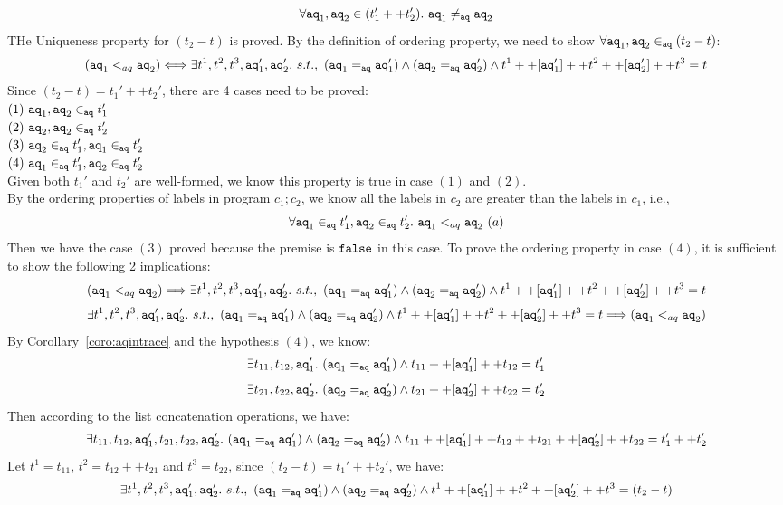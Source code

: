 \[
	\forall \mathtt{aq}_1, \mathtt{aq}_2 \in (t_1' ++ t_2'). ~ \mathtt{aq}_1 \neq_{\mathtt{aq}} \mathtt{aq}_2
\]
%
THe Uniqueness property for $(t_2 - t)$ is proved.
%
%
By the definition of ordering property, we need to show $\forall \mathtt{aq}_1, \mathtt{aq}_2 \in_{\mathtt{aq}} (t_2 - t)$:
\[
	(\mathtt{aq}_1 <_{aq} \mathtt{aq}_2) \Longleftrightarrow
	\exists t^1, t^2, t^3, \mathtt{aq}_1', \mathtt{aq}_2'. ~ s.t.,~ 
	(\mathtt{aq}_1 =_{\mathtt{aq}} \mathtt{aq}_1') \land (\mathtt{aq}_2 =_{\mathtt{aq}} \mathtt{aq}_2') \land t^1 ++ [\mathtt{aq}_1'] ++ t^2 ++ [\mathtt{aq}_2'] ++ t^3 = t
\]
%
Since $(t_2 - t) = t_1' ++ t_2'$, there are 4 cases need to be proved:
\\
$(1) ~ \mathtt{aq}_1, \mathtt{aq}_2 \in_{\mathtt{aq}} t_1'$
\\
$(2) ~ \mathtt{aq}_2, \mathtt{aq}_2 \in_{\mathtt{aq}} t_2'$
\\
$(3) ~ \mathtt{aq}_2 \in_{\mathtt{aq}} t_1', \mathtt{aq}_1 \in_{\mathtt{aq}} t_2'$ 
\\
$(4) ~ \mathtt{aq}_1 \in_{\mathtt{aq}} t_1', \mathtt{aq}_2 \in_{\mathtt{aq}} t_2'$
\\
Given both $t_1'$ and $t_2'$ are well-formed, we know this property is true in case $(1)$ and $(2)$.
\\
By the ordering properties of labels in program $c_1; c_2$,
we know all the labels in $c_2$ are greater than the labels in $c_1$, i.e.,
\[
	\forall \mathtt{aq}_1 \in_{\mathtt{aq}} t_1', \mathtt{aq}_2 \in_{\mathtt{aq}} t_2'. ~ \mathtt{aq}_1 <_{aq} \mathtt{aq}_2 ~ (a)
\]
%
Then we have the case $(3)$ proved because the premise is $\mathtt{false}$ in this case.
%
To prove the ordering property in case $(4)$, it is sufficient to show the following 2 implications:
\[
	(\mathtt{aq}_1 <_{aq} \mathtt{aq}_2) 
	\Longrightarrow
	\exists t^1, t^2, t^3, \mathtt{aq}_1', \mathtt{aq}_2'. ~ s.t.,~ 
	(\mathtt{aq}_1 =_{\mathtt{aq}} \mathtt{aq}_1') \land (\mathtt{aq}_2 =_{\mathtt{aq}} \mathtt{aq}_2') \land t^1 ++ [\mathtt{aq}_1'] ++ t^2 ++ [\mathtt{aq}_2'] ++ t^3 = t
\]
%
\[
	\exists t^1, t^2, t^3, \mathtt{aq}_1', \mathtt{aq}_2'. ~ s.t.,~ 
	(\mathtt{aq}_1 =_{\mathtt{aq}} \mathtt{aq}_1') \land (\mathtt{aq}_2 =_{\mathtt{aq}} \mathtt{aq}_2') \land t^1 ++ [\mathtt{aq}_1'] ++ t^2 ++ [\mathtt{aq}_2'] ++ t^3 = t
	 \Longrightarrow
	(\mathtt{aq}_1 <_{aq} \mathtt{aq}_2)
\]
%
By Corollary~\ref{coro:aqintrace} and the hypothesis $(4)$, we know:
%
\[
	\exists t_{11}, t_{12}, \mathtt{aq}_1'. ~ (\mathtt{aq}_1 =_{\mathtt{aq}} \mathtt{aq}_1') \land t_{11} ++ [\mathtt{aq}_1'] ++ t_{12} = t_1'
\]
%
\[
	\exists t_{21}, t_{22}, \mathtt{aq}_2'. ~ (\mathtt{aq}_2 =_{\mathtt{aq}} \mathtt{aq}_2') \land t_{21} ++ [\mathtt{aq}_2'] ++ t_{22} = t_2'
\]
%
Then according to the list concatenation operations, we have:
%
\[
	\exists t_{11}, t_{12}, \mathtt{aq}_1', t_{21}, t_{22}, \mathtt{aq}_2'. ~ (\mathtt{aq}_1 =_{\mathtt{aq}} \mathtt{aq}_1') \land (\mathtt{aq}_2 =_{\mathtt{aq}} \mathtt{aq}_2') \land 
	t_{11} ++ [\mathtt{aq}_1'] ++ t_{12} ++ t_{21} ++ [\mathtt{aq}_2'] ++ t_{22} = t_1' ++ t_2'
\]
%
Let $t^1 = t_{11}$, $t^2 = t_{12} ++ t_{21}$ and $t^3 = t_{22}$, since $(t_2 - t) = t_1' ++ t_2'$, we have:
%
\[
	\exists t^1, t^2, t^3, \mathtt{aq}_1', \mathtt{aq}_2'. ~ s.t.,~ 
	(\mathtt{aq}_1 =_{\mathtt{aq}} \mathtt{aq}_1') \land (\mathtt{aq}_2 =_{\mathtt{aq}} \mathtt{aq}_2') \land t^1 ++ [\mathtt{aq}_1'] ++ t^2 ++ [\mathtt{aq}_2'] ++ t^3 = (t_2 - t)
\]
